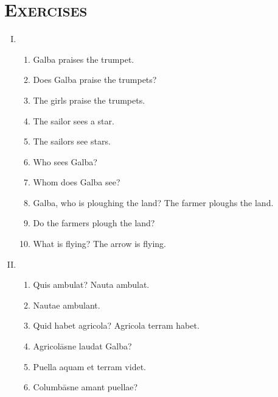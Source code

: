 \documentclass[12pt]{article}
\begin{document}
\section{\textsc{Exercises}}
\begin{enumerate}[I.]
	\setlength{\itemsep}{1em}
	\item \begin{enumerate}[1)]
		\item Galba praises the trumpet.
		\item Does Galba praise the trumpets?
		\item The girls praise the trumpets.
		\item The sailor sees a star.
		\item The sailors see stars.
		\item Who sees Galba?
		\item Whom does Galba see?
		\item Galba, who is ploughing the land? The farmer ploughs the land.
		\item Do the farmers plough the land?
		\item What is flying? The arrow is flying.
	\end{enumerate}
	\item \begin{enumerate}[1)]
		\item Quis ambulat? Nauta ambulat.
		\item Nautae ambulant.
		\item Quid habet agricola? Agricola terram habet.
		\item Agricolāsne laudat Galba?
		\item Puella aquam et terram videt.
		\item Columbāsne amant puellae?
	\end{enumerate}
\end{enumerate}
\end{document}
